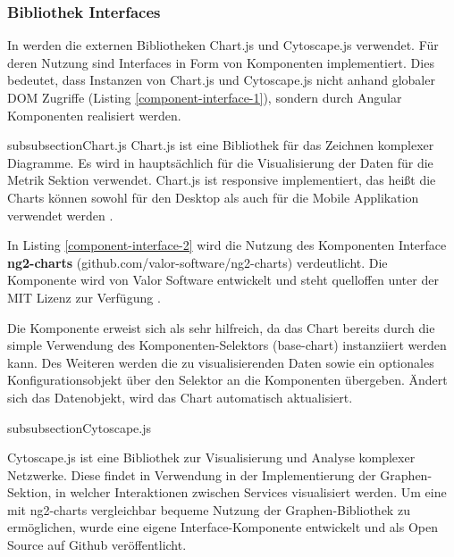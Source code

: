 \subsubsection{Bibliothek Interfaces}

In \projectname{} werden die externen Bibliotheken Chart.js und Cytoscape.js verwendet.
Für deren Nutzung sind Interfaces in Form von Komponenten implementiert.
Dies bedeutet, dass Instanzen von Chart.js und Cytoscape.js nicht anhand globaler \ac{DOM} Zugriffe (Listing \ref{component-interface-1}),
sondern durch Angular Komponenten realisiert werden.


\*subsubsection{Chart.js}
Chart.js ist eine Bibliothek für das Zeichnen komplexer Diagramme.
Es wird in \projectname{} hauptsächlich für die Visualisierung der Daten für die Metrik Sektion verwendet.
Chart.js ist responsive implementiert, das heißt die Charts können sowohl für den Desktop
als auch für die Mobile Applikation verwendet werden \cite{Chart80:online}.

\vspace{0.3cm}



\vspace{0.3cm}
In Listing \ref{component-interface-2} wird die Nutzung des Komponenten Interface \textbf{ng2-charts} (github.com/valor-software/ng2-charts) verdeutlicht.
Die Komponente wird von Valor Software entwickelt und steht quelloffen unter der MIT Lizenz zur Verfügung \cite{valor6:online}.

Die Komponente erweist sich als sehr hilfreich, da das Chart bereits durch die simple Verwendung des Komponenten-Selektors (base-chart) instanziiert werden kann.
Des Weiteren werden die zu visualisierenden Daten sowie ein optionales Konfigurationsobjekt über den Selektor an die Komponenten übergeben.
Ändert sich das Datenobjekt, wird das Chart automatisch aktualisiert.



\*subsubsection{Cytoscape.js}

Cytoscape.js ist eine Bibliothek zur Visualisierung und Analyse komplexer Netzwerke.
Diese findet in \projectname{} Verwendung in der Implementierung der Graphen-Sektion,
in welcher Interaktionen zwischen Services visualisiert werden.
Um eine mit ng2-charts vergleichbar bequeme Nutzung der Graphen-Bibliothek zu ermöglichen,
wurde eine eigene Interface-Komponente entwickelt und als Open Source auf Github veröffentlicht.

